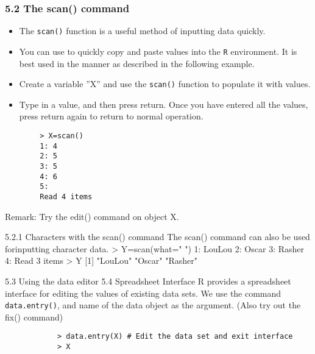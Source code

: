 \documentclass{beamer}
\begin{document}
 	\begin{frame}
 		\frametitle{5.2 The scan() command}
 		\begin{itemize}
 			\item	The \texttt{scan()} function is a useful method of inputting data quickly. 
 			\item You can use to quickly copy
 			and paste values into the \texttt{R} environment. It is best used in the manner as described in the
 			following example. 
 			\item Create a variable ”X” and use the \texttt{scan()} function to populate it with
 			values. 
 			\item Type in a value, and then press return. Once you have entered all the values, press
 			return again to return to normal operation.
 		\end{itemize}
 	\end{frame}
 	\begin{frame}[fragile]
 		\begin{verbatim}
 		> X=scan()
 		1: 4
 		2: 5
 		3: 5
 		4: 6
 		5:
 		Read 4 items
 		\end{verbatim}
 		Remark: Try the edit() command on object X.
 	\end{frame}
 	\begin{frame}[fragile]
 		5.2.1 Characters with the scan() command
 		The scan() command can also be used forinputting character data.
 		> Y=scan(what=" ")
 		1: LouLou
 		2: Oscar
 		3: Rasher
 		4:
 		Read 3 items
 		> Y
 		[1] "LouLou" "Oscar" "Rasher"
 	\end{frame}
 	\begin{frame}[fragile]
 		5.3 Using the data editor
 		5.4 Spreadsheet Interface
 		R provides a spreadsheet interface for editing the values of existing data sets. We use the
 		command \texttt{data.entry()}, and name of the data object as the argument. (Also try out the
 		fix() command)
 		\begin{framed}
 			\begin{verbatim}
 			> data.entry(X) # Edit the data set and exit interface
 			> X
 			\end{verbatim}
 		\end{framed}
 		
 	\end{frame}
 	
 
\end{document}
